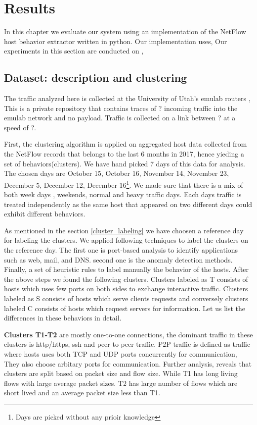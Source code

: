 
\chapter{Results}

In this chapter we evaluate our system using an implementation of the NetFlow host behavior extractor written in python. Our implementation uses, Our experiments in this section are conducted on , 

\section{Dataset: description and clustering}
The traffic analyzed here is collected at the University of Utah's emulab routers \cite{}, This is a private repository that contains traces of ? incoming traffic into the emulab network and no payload. Traffic is collected on a link between ? at a speed of ?.

First, the clustering algorithm is applied on aggregated host data collected from the NetFlow records that belongs to the last 6 months in 2017, hence yieding a set of behaviors(clusters). We have hand picked 7 days of this data for analysis. The chosen days are October 15, October 16, November 14, November 23, December 5, December 12, December 16\footnote{Days are picked without any prioir knowledge}. We made sure that there is a mix of both week days , weekends, normal and heavy traffic days. Each days traffic is treated independently as the same host that appeared on two different days could exhibit different behaviors.

As mentioned in the section \ref{cluster_labeling} we have choosen a reference day for labeling the clusters. We applied following techniques to label the clusters on the reference day. The first one is port-based analysis to identify applications such as web, mail, and DNS. second one is the anomaly detection methods. Finally, a set of heuristic rules to label manually the behavior of the hosts. After the above steps we found the following clusters. Clusters labeled as T consists of hosts which uses few ports on both sides to exchange interactive traffic. Clusters labeled as S consists of hosts which serve clients requests and conversely clusters labeled C consists of hosts which request servers for information. Let us list the differences in these behaviors in detail.

\textbf{Clusters T1-T2} are mostly one-to-one connections, the dominant traffic in these clusters is http/https, ssh and peer to peer traffic. P2P traffic is defined as traffic where hosts uses both TCP and UDP ports concurrently for communication, They also choose arbitary ports for communication. Further analysis, reveals that clusters are split based on packet size and flow size.
While T1 has long living flows with large average packet sizes. T2 has large number of flows which are short lived and an average packet size less than T1.

